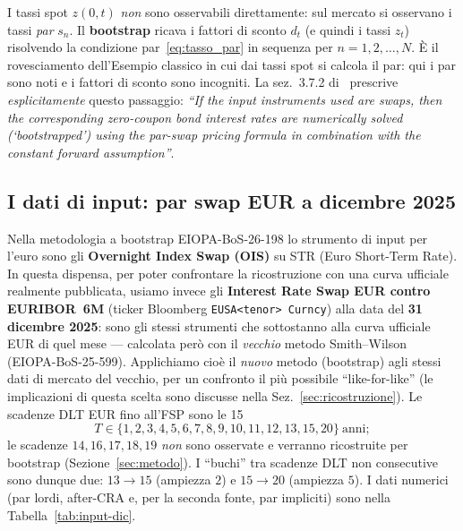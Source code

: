 \documentclass[11pt,a4paper]{article}
\theoremstyle{plain}
\theoremstyle{definition}
\theoremstyle{remark}
\newcommand{\estr}{\texteuro{}STR}
\begin{document}
\begin{keybox}
I tassi spot $z(0,t)$ \emph{non} sono osservabili direttamente: sul mercato si osservano i
tassi \emph{par} $s_n$. Il \textbf{bootstrap} ricava i fattori di sconto $d_t$ (e quindi i
tassi $z_t$) risolvendo la condizione par~\eqref{eq:tasso_par} in sequenza per
$n=1,2,\ldots,N$. \`E il rovesciamento dell'Esempio classico in cui dai tassi spot si calcola
il par: qui i par sono noti e i fattori di sconto sono incogniti. La sez.~3.7.2
di~\cite{eiopa2026} prescrive \emph{esplicitamente} questo passaggio:
\emph{``If the input instruments used are swaps, then the corresponding zero-coupon bond
interest rates are numerically solved (`bootstrapped') using the par-swap pricing formula in
combination with the constant forward assumption''}.
\end{keybox}

\subsection{I dati di input: par swap EUR a dicembre 2025}
\label{sec:dati-input}

Nella metodologia a bootstrap EIOPA-BoS-26-198 lo strumento di input per l'euro sono gli
\textbf{Overnight Index Swap (OIS)} su \estr{} (Euro Short-Term Rate). In questa dispensa,
per poter confrontare la ricostruzione con una curva ufficiale realmente pubblicata,
usiamo invece gli \textbf{Interest Rate Swap EUR contro EURIBOR~6M} (ticker Bloomberg
\texttt{EUSA<tenor> Curncy}) alla data del \textbf{31 dicembre 2025}: sono gli stessi
strumenti che sottostanno alla curva ufficiale EUR di quel mese --- calcolata per\`o con il
\emph{vecchio} metodo Smith--Wilson (EIOPA-BoS-25-599). Applichiamo cio\`e il \emph{nuovo}
metodo (bootstrap) agli stessi dati di mercato del vecchio, per un confronto il pi\`u
possibile ``like-for-like'' (le implicazioni di questa scelta sono discusse nella
Sez.~\ref{sec:ricostruzione}). Le scadenze DLT EUR fino all'FSP sono le 15
\[
  T \in \{1,2,3,4,5,6,7,8,9,10,11,12,13,15,20\}\ \text{anni};
\]
le scadenze $14,16,17,18,19$ \emph{non} sono osservate e verranno ricostruite per bootstrap
(Sezione~\ref{sec:metodo}). I ``buchi'' tra scadenze DLT non consecutive sono dunque due:
$13\!\to\!15$ (ampiezza $2$) e $15\!\to\!20$ (ampiezza $5$). I dati numerici (par lordi,
after-CRA e, per la seconda fonte, par impliciti) sono nella Tabella~\ref{tab:input-dic}.
\end{document}
